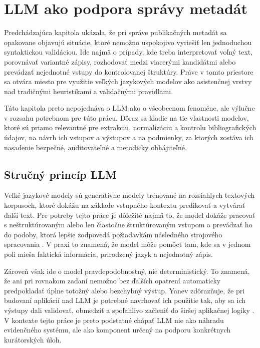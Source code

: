 

\section{LLM ako podpora správy metadát}

Predchádzajúca kapitola ukázala, že pri správe publikačných metadát sa opakovane objavujú situácie, ktoré nemožno uspokojivo vyriešiť len jednoduchou syntaktickou validáciou. Ide najmä o prípady, kde treba interpretovať voľný text, porovnávať variantné zápisy, rozhodovať medzi viacerými kandidátmi alebo prevádzať nejednotné vstupy do kontrolovanej štruktúry. Práve v tomto priestore sa otvára miesto pre využitie veľkých jazykových modelov ako asistenčnej vrstvy nad tradičnými heuristikami a validačnými pravidlami.

Táto kapitola preto nepojednáva o LLM ako o všeobecnom fenoméne, ale výlučne v rozsahu potrebnom pre túto prácu. Dôraz sa kladie na tie vlastnosti modelov, ktoré sú priamo relevantné pre extrakciu, normalizáciu a kontrolu bibliografických údajov, na návrh ich vstupov a výstupov a na podmienky, za ktorých zostáva ich nasadenie bezpečné, auditovateľné a metodicky obhájiteľné.

\subsection{Stručný princíp LLM}

Veľké jazykové modely sú generatívne modely trénované na rozsiahlych textových korpusoch, ktoré dokážu na základe vstupného kontextu predikovať a vytvárať ďalší text. Pre potreby tejto práce je dôležité najmä to, že model dokáže pracovať s neštruktúrovaným alebo len čiastočne štruktúrovaným vstupom a prevádzať ho do podoby, ktorá lepšie zodpovedá požiadavkám následného strojového spracovania \cite{AlammarGrootendorst2024,Foster2019}. V praxi to znamená, že model môže pomôcť tam, kde sa v jednom poli mieša faktická informácia, prirodzený jazyk a nejednotný zápis.

Zároveň však ide o model pravdepodobnostný, nie deterministický. To znamená, že ani pri rovnakom zadaní nemožno bez ďalších opatrení automaticky predpokladať úplne totožný alebo bezchybný výstup. Yanev zdôrazňuje, že pri budovaní aplikácií nad LLM je potrebné navrhovať ich použitie tak, aby sa ich výstupy dali validovať, obmedziť a spoľahlivo začleniť do širšej aplikačnej logiky \cite{Yanev2024}. V kontexte tejto práce je preto podstatné chápať LLM nie ako náhradu evidenčného systému, ale ako komponent určený na podporu konkrétnych kurátorských úloh.

